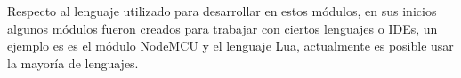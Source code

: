 \documentclass[../proyecto.tex]{subfiles}
\begin{document}
Respecto al lenguaje utilizado para desarrollar en estos módulos, en sus inicios algunos módulos fueron creados para trabajar con ciertos lenguajes o IDEs, un ejemplo es es el módulo NodeMCU \cite{nodemcu_official_page} y el lenguaje Lua, actualmente es posible usar la mayoría de lenguajes.


\end{document}
